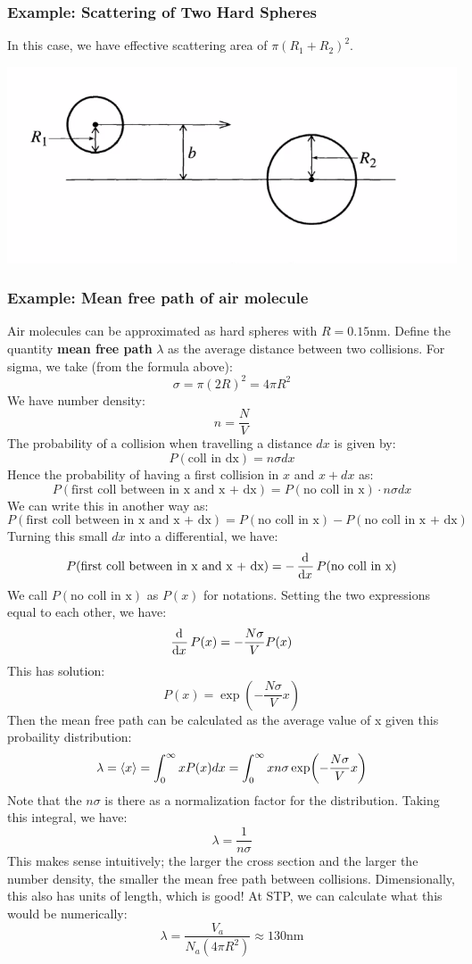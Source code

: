 \subsubsection{Example: Scattering of Two Hard Spheres}
In this case, we have effective scattering area of $\pi(R_1 + R_2)^2$.
\begin{center}
    \includegraphics[scale=0.7]{Lecture-27/l27-img6.png}
\end{center}

\subsubsection{Example: Mean free path of air molecule}
Air molecules can be approximated as hard spheres with $R = 0.15\text{nm}$. Define the quantity \textbf{mean free path} $\lambda$ as the average distance between two collisions. For sigma, we take (from the formula above):
\[\sigma = \pi(2R)^2 = 4\pi R^2\]
We have number density:
\[n = \frac{N}{V}\]
The probability of a collision when travelling a distance $dx$ is given by:
\[P(\text{coll in dx}) = n\sigma dx\]
Hence the probability of having a first collision in $x$ and $x + dx$ as:
\[P(\text{first coll between in x and x + dx}) = P(\text{no coll in x})\cdot n \sigma dx\]
We can write this in another way as:
\[P(\text{first coll between in x and x + dx}) = P(\text{no coll in x}) - P(\text{no coll in x + dx})\]
Turning this small $dx$ into a differential, we have:
\[P(\text{first coll between in x and x + dx}) = -\dod{}{x}P(\text{no coll in x})\]
We call $P(\text{no coll in x})$ as $P(x)$ for notations. Setting the two expressions equal to each other, we have:
\[\dod{}{x}P(x) = -\frac{N\sigma}{V}P(x)\]
This has solution:
\[P(x) = \exp(-\frac{N\sigma}{V}x)\]
Then the mean free path can be calculated as the average value of x given this probaility distribution:
\[\lambda = \left< x \right> = \int_{0}^{\infty}xP(x)dx = \int_0^\infty xn\sigma \exp(-\frac{N\sigma}{V}x)\]
Note that the $n\sigma$ is there as a normalization factor for the distribution. Taking this integral, we have:
\[\lambda = \frac{1}{n\sigma}\]
This makes sense intuitively; the larger the cross section and the larger the number density, the smaller the mean free path between collisions. Dimensionally, this also has units of length, which is good! At STP, we can calculate what this would be numerically:
\[\lambda = \frac{V_a}{N_a(4\pi R^2)} \approx 130\text{nm}\]

